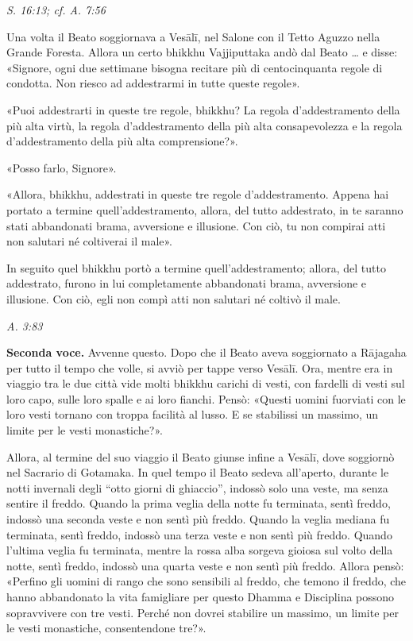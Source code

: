 \emph{S. 16:13; cf. A. 7:56}


Una volta il Beato soggiornava a Vesālī, nel Salone con il Tetto Aguzzo
nella Grande Foresta. Allora un certo bhikkhu Vajjiputtaka andò dal
Beato … e disse: «Signore, ogni due settimane bisogna recitare più di
centocinquanta regole di condotta. Non riesco ad addestrarmi in tutte
queste regole».


«Puoi addestrarti in queste tre regole, bhikkhu? La regola
d’addestramento della più alta virtù, la regola d’addestramento della
più alta consapevolezza e la regola d’addestramento della più alta
comprensione?».


«Posso farlo, Signore».


«Allora, bhikkhu, addestrati in queste tre regole d’addestramento.
Appena hai portato a termine quell’addestramento, allora, del tutto
addestrato, in te saranno stati abbandonati brama, avversione e
illusione. Con ciò, tu non compirai atti non salutari né coltiverai il
male».


In seguito quel bhikkhu portò a termine quell’addestramento; allora, del
tutto addestrato, furono in lui completamente abbandonati brama,
avversione e illusione. Con ciò, egli non compì atti non salutari né
coltivò il male.


\emph{A. 3:83}


\textbf{Seconda voce.} Avvenne questo. Dopo che il Beato aveva soggiornato a
Rājagaha per tutto il tempo che volle, si avviò per tappe verso Vesālī.
Ora, mentre era in viaggio tra le due città vide molti bhikkhu carichi
di vesti, con fardelli di vesti sul loro capo, sulle loro spalle e ai
loro fianchi. Pensò: «Questi uomini fuorviati con le loro vesti tornano
con troppa facilità al lusso. E se stabilissi un massimo, un limite per
le vesti monastiche?».


Allora, al termine del suo viaggio il Beato giunse infine a Vesālī, dove
soggiornò nel Sacrario di Gotamaka. In quel tempo il Beato sedeva
all’aperto, durante le notti invernali degli “otto giorni di ghiaccio”,
indossò solo una veste, ma senza sentire il freddo. Quando la prima
veglia della notte fu terminata, sentì freddo, indossò una seconda veste
e non sentì più freddo. Quando la veglia mediana fu terminata, sentì
freddo, indossò una terza veste e non sentì più freddo. Quando l’ultima
veglia fu terminata, mentre la rossa alba sorgeva gioiosa sul volto
della notte, sentì freddo, indossò una quarta veste e non sentì più
freddo. Allora pensò: «Perfino gli uomini di rango che sono sensibili al
freddo, che temono il freddo, che hanno abbandonato la vita famigliare
per questo Dhamma e Disciplina possono sopravvivere con tre vesti.
Perché non dovrei stabilire un massimo, un limite per le vesti
monastiche, consentendone tre?».



